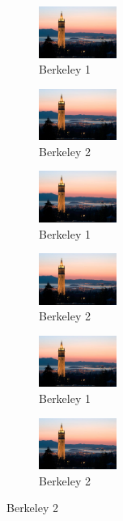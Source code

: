 \documentclass{article}
\begin{document}
\begin{figure}[h!]
	\centering
	\begin{subfigure}[t]{1in}
		\centering
		\includegraphics[width=1in]{campanile.jpg}	
		\caption{Berkeley 1}\label{fig:2a}			
	\end{subfigure}
	\begin{subfigure}[t]{1in}
		\centering
		\includegraphics[width=1in]{campanile.jpg}
		\caption{Berkeley 2}\label{fig:2b}		
	\end{subfigure}
	\begin{subfigure}[t]{1in}
	\centering
	\includegraphics[width=1in]{campanile.jpg}	
	\caption{Berkeley 1}\label{fig:2a}			
	\end{subfigure}
	\begin{subfigure}[t]{1in}
		\centering
		\includegraphics[width=1in]{campanile.jpg}
		\caption{Berkeley 2}\label{fig:2b}		
	\end{subfigure}
	\caption{Berkeley at sunset - twice}\label{fig:2}
	\begin{subfigure}[t]{1in}
	\centering
	\includegraphics[width=1in]{campanile.jpg}	
	\caption{Berkeley 1}\label{fig:2a}			
\end{subfigure}
\begin{subfigure}[t]{1in}
	\centering
	\includegraphics[width=1in]{campanile.jpg}
	\caption{Berkeley 2}\label{fig:2b}		
\end{subfigure}
\end{figure}
\end{document}
